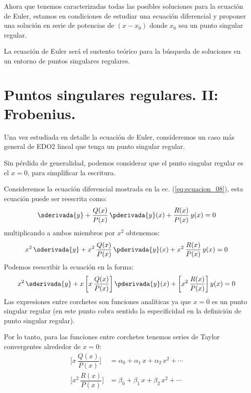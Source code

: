 Ahora que tenemos caracterizadas todas las posibles soluciones para la ecuación de Euler, estamos en condiciones de estudiar una ecuación diferencial y proponer una solución en serie de potencias de $(x - x_{0})$ donde $x_{0}$ sea un punto singular regular.
\par
La ecuación de Euler será el sustento teórico para la búsqueda de soluciones en un entorno de puntos singulares regulares.

\section{Puntos singulares regulares. II: Frobenius.}

Una vez estudiada en detalle la ecuación de Euler, consideremos un caso más general de EDO2 lineal que tenga un punto singular regular.
\par
Sin pérdida de generalidad, podemos considerar que el punto singular regular es el $x = 0$, para simplificar la escritura.
\par
Consideremos la ecuación diferencial mostrada en la ec. (\ref{eq:ecuacion_08}), esta ecuación puede ser reescrita como:
\begin{align*}
\sderivada{y} + \dfrac{Q (x)}{P (x)} \, \pderivada{y} (x) + \dfrac{R (x)}{P (x)} \, y (x) = 0
\end{align*}
multiplicando a ambos miembros por $x^{2}$ obtenemos:
\begin{align*}
x^{2} \, \sderivada{y} + x^{2} \, \dfrac{Q (x)}{P (x)} \, \pderivada{y} (x) + x^{2}\, \dfrac{R (x)}{P (x)} \, y (x) = 0
\end{align*}
Podemos reescribir la ecuación en la forma:
\begin{align*}
x^{2} \, \sderivada{y} + x \, \bigg[ x \, \dfrac{Q (x)}{P (x)} \bigg] \, \pderivada{y} (x) + \bigg[ x^{2} \, \dfrac{R (x)}{P (x)} \bigg] \, y (x) = 0
\end{align*}
Las expresiones entre corchetes son funciones analíticas ya que $x = 0$ es un punto singular regular (en este punto cobra sentido la especificidad en la definición de punto singular regular).
\par
Por lo tanto, para las funciones entre corchetes tenemos series de Taylor convergentes alrededor de $x = 0$:
\begin{align*}
\bigg[ x \, \dfrac{Q (x)}{P (x)} \bigg] &= \alpha_{0} + \alpha_{1} \, x + \alpha_{2} \, x^{2} + \cdots \\[0.5em]
\bigg[ x^{2} \, \dfrac{R (x)}{P (x)} \bigg] &= \beta_{0} + \beta_{1} \, x + \beta_{2} \, x^{2} + \cdots \\[0.5em]
\end{align*}


